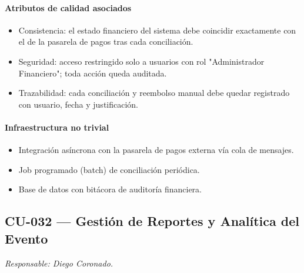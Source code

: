 \paragraph{Atributos de calidad asociados}
\begin{itemize}[leftmargin=1.4em, topsep=1pt]
  \item Consistencia: el estado financiero del sistema debe coincidir exactamente con el de la pasarela de pagos tras cada conciliación.
  \item Seguridad: acceso restringido solo a usuarios con rol "Administrador Financiero"; toda acción queda auditada.
  \item Trazabilidad: cada conciliación y reembolso manual debe quedar registrado con usuario, fecha y justificación.
\end{itemize}

\paragraph{Infraestructura no trivial}
\begin{itemize}[leftmargin=1.4em, topsep=1pt]
  \item Integración asíncrona con la pasarela de pagos externa vía cola de mensajes.
  \item Job programado (batch) de conciliación periódica.
  \item Base de datos con bitácora de auditoría financiera.
\end{itemize}

\subsection{CU-032 --- Gestión de Reportes y Analítica del Evento}
\label{cu:cu-032}
\textit{Responsable: Diego Coronado.}

